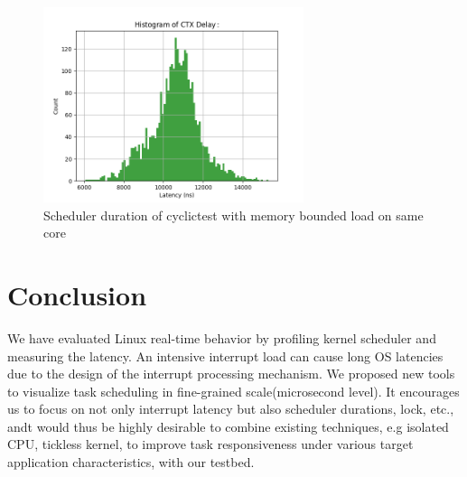 \documentclass[conference]{IEEEtran}
\begin{document}
    \begin{figure} \centering \includegraphics[width=3in]{img/sd-same-no-cache.png} \caption{Scheduler duration of
    cyclictest with memory bounded load on same core} \label{fig:sd_same_no_cache} \end{figure}

\section{Conclusion}
    We have evaluated Linux real-time behavior by profiling kernel scheduler and measuring the latency.
    An intensive interrupt load can cause long OS latencies due to the design of the interrupt
    processing mechanism. We proposed new tools to visualize task scheduling in fine-grained scale(microsecond level).
    It encourages us to focus on not only interrupt latency but also scheduler durations, lock, etc., andt would thus
    be highly desirable to combine existing techniques, e.g isolated CPU, tickless kernel, to improve task responsiveness
    under various target application characteristics, with our testbed.



\end{document}
